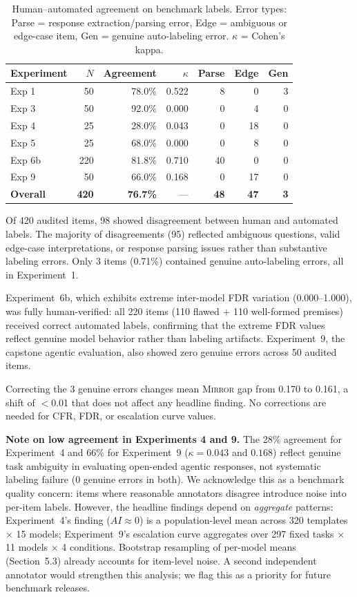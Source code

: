 \documentclass[10pt]{article}
\newcommand{\mirror}{\textsc{Mirror}}
\newcommand{\CFR}{CFR}
\newcommand{\FDR}{FDR}
\newcommand{\AI}{AI}
\begin{document}
\begin{table}[h]
\centering
\caption{Human--automated agreement on benchmark labels. Error types:
  Parse = response extraction/parsing error, Edge = ambiguous or edge-case item,
  Gen = genuine auto-labeling error. $\kappa$ = Cohen's kappa.}
\label{tab:human-audit}
\small
\begin{tabular}{lrrrrrr}
\toprule
Experiment & $N$ & Agreement & $\kappa$ & Parse & Edge & Gen \\
\midrule
Exp 1 & 50 & 78.0\% & 0.522 & 8 & 0 & 3 \\
Exp 3 & 50 & 92.0\% & 0.000 & 0 & 4 & 0 \\
Exp 4 & 25 & 28.0\% & 0.043 & 0 & 18 & 0 \\
Exp 5 & 25 & 68.0\% & 0.000 & 0 & 8 & 0 \\
Exp 6b & 220 & 81.8\% & 0.710 & 40 & 0 & 0 \\
Exp 9 & 50 & 66.0\% & 0.168 & 0 & 17 & 0 \\
\midrule
\textbf{Overall} & \textbf{420} & \textbf{76.7\%} & --- & \textbf{48} & \textbf{47} & \textbf{3} \\
\bottomrule
\end{tabular}
\end{table}

Of 420 audited items, 98 showed disagreement between human and automated labels.
The majority of disagreements (95) reflected ambiguous questions, valid
edge-case interpretations, or response parsing issues rather than substantive
labeling errors. Only 3 items (0.71\%) contained genuine auto-labeling errors,
all in Experiment~1.

Experiment~6b, which exhibits extreme inter-model FDR variation (0.000--1.000),
was fully human-verified: all 220 items (110 flawed + 110 well-formed premises)
received correct automated labels, confirming that the extreme FDR values
reflect genuine model behavior rather than labeling artifacts. Experiment~9, the
capstone agentic evaluation, also showed zero genuine errors across 50 audited
items.

Correcting the 3 genuine errors changes mean \mirror{} gap from 0.170 to 0.161,
a shift of $<$0.01 that does not affect any headline finding. No corrections are
needed for \CFR{}, \FDR{}, or escalation curve values.

\textbf{Note on low agreement in Experiments 4 and 9.} The 28\% agreement for
Experiment~4 and 66\% for Experiment~9 ($\kappa = 0.043$ and $0.168$) reflect
genuine task ambiguity in evaluating open-ended agentic responses, not systematic
labeling failure (0 genuine errors in both). We acknowledge this as a benchmark
quality concern: items where reasonable annotators disagree introduce noise into
per-item labels. However, the headline findings depend on \emph{aggregate}
patterns: Experiment~4's finding ($\AI{} \approx 0$) is a population-level mean
across 320 templates $\times$ 15 models; Experiment~9's escalation curve aggregates
over 297 fixed tasks $\times$ 11 models $\times$ 4 conditions. Bootstrap
resampling of per-model means (Section~5.3) already accounts for item-level noise.
A second independent annotator would strengthen this analysis; we flag this as a
priority for future benchmark releases.
\end{document}
